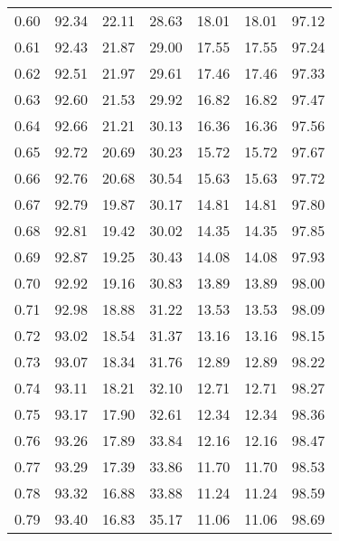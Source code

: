 \begin{tabular}{|c|c|c|c|c|c|c|}
      0.60 &     92.34 &     22.11 &      28.63 &   18.01 &      18.01 &         97.12 \\
      0.61 &     92.43 &     21.87 &      29.00 &   17.55 &      17.55 &         97.24 \\
      0.62 &     92.51 &     21.97 &      29.61 &   17.46 &      17.46 &         97.33 \\
      0.63 &     92.60 &     21.53 &      29.92 &   16.82 &      16.82 &         97.47 \\
      0.64 &     92.66 &     21.21 &      30.13 &   16.36 &      16.36 &         97.56 \\
      0.65 &     92.72 &     20.69 &      30.23 &   15.72 &      15.72 &         97.67 \\
      0.66 &     92.76 &     20.68 &      30.54 &   15.63 &      15.63 &         97.72 \\
      0.67 &     92.79 &     19.87 &      30.17 &   14.81 &      14.81 &         97.80 \\
      0.68 &     92.81 &     19.42 &      30.02 &   14.35 &      14.35 &         97.85 \\
      0.69 &     92.87 &     19.25 &      30.43 &   14.08 &      14.08 &         97.93 \\
      0.70 &     92.92 &     19.16 &      30.83 &   13.89 &      13.89 &         98.00 \\
      0.71 &     92.98 &     18.88 &      31.22 &   13.53 &      13.53 &         98.09 \\
      0.72 &     93.02 &     18.54 &      31.37 &   13.16 &      13.16 &         98.15 \\
      0.73 &     93.07 &     18.34 &      31.76 &   12.89 &      12.89 &         98.22 \\
      0.74 &     93.11 &     18.21 &      32.10 &   12.71 &      12.71 &         98.27 \\
      0.75 &     93.17 &     17.90 &      32.61 &   12.34 &      12.34 &         98.36 \\
      0.76 &     93.26 &     17.89 &      33.84 &   12.16 &      12.16 &         98.47 \\
      0.77 &     93.29 &     17.39 &      33.86 &   11.70 &      11.70 &         98.53 \\
      0.78 &     93.32 &     16.88 &      33.88 &   11.24 &      11.24 &         98.59 \\
      0.79 &     93.40 &     16.83 &      35.17 &   11.06 &      11.06 &         98.69 \\

\end{tabular}
